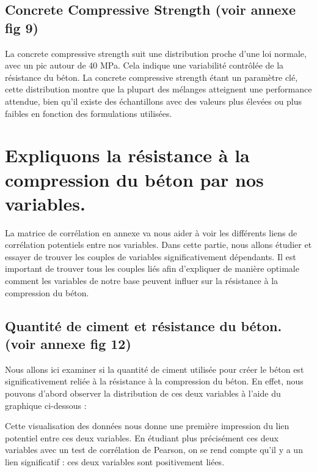 \documentclass[
  12pt,
]{article}
\begin{document}
\subsection{Concrete Compressive Strength (voir annexe fig
9)}\label{concrete-compressive-strength-voir-annexe-fig-9}

La concrete compressive strength suit une distribution proche d'une loi
normale, avec un pic autour de 40 MPa. Cela indique une variabilité
contrôlée de la résistance du béton. La concrete compressive strength
étant un paramètre clé, cette distribution montre que la plupart des
mélanges atteignent une performance attendue, bien qu'il existe des
échantillons avec des valeurs plus élevées ou plus faibles en fonction
des formulations utilisées.

\newpage

\section{Expliquons la résistance à la compression du béton par nos
variables.}\label{expliquons-la-ruxe9sistance-uxe0-la-compression-du-buxe9ton-par-nos-variables.}

La matrice de corrélation en annexe va nous aider à voir les différents
liens de corrélation potentiels entre nos variables. Dans cette partie,
nous allons étudier et essayer de trouver les couples de variables
significativement dépendants. Il est important de trouver tous les
couples liés afin d'expliquer de manière optimale comment les variables
de notre base peuvent influer sur la résistance à la compression du
béton.

\subsection{Quantité de ciment et résistance du béton. (voir annexe fig
12)}\label{quantituxe9-de-ciment-et-ruxe9sistance-du-buxe9ton.-voir-annexe-fig-12}

Nous allons ici examiner si la quantité de ciment utilisée pour créer le
béton est significativement reliée à la résistance à la compression du
béton. En effet, nous pouvons d'abord observer la distribution de ces
deux variables à l'aide du graphique ci-dessous :

Cette visualisation des données nous donne une première impression du
lien potentiel entre ces deux variables. En étudiant plus précisément
ces deux variables avec un test de corrélation de Pearson, on se rend
compte qu'il y a un lien significatif : ces deux variables sont
positivement liées.
\end{document}
